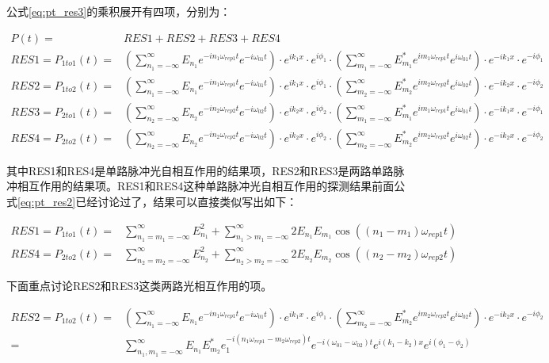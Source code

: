 公式\eqref{eq:pt_res3}的乘积展开有四项，分别为：
\begin{footnotesize}
\begin{align}
    P(t)=&RES1+RES2+RES3+RES4\\
    RES1=P_{1to1}(t)=&\left(\sum_{n_1=-\infty}^{\infty}E_{n_1}e^{-in_1\omega_{rep1}t}e^{-i\omega_{01}t}\right)\cdot e^{ik_1x}\cdot e^{i\phi_1} 
    \cdot \left(\sum_{m_1=-\infty}^{\infty}E_{m_1}^* e^{im_1\omega_{rep1}t}e^{i\omega_{01}t}\right)\cdot e^{-ik_1x}\cdot e^{-i\phi_1}\\
    RES2=P_{1to2}(t)=&\left(\sum_{n_1=-\infty}^{\infty}E_{n_1}e^{-in_1\omega_{rep1}t}e^{-i\omega_{01}t}\right)\cdot e^{ik_1x}\cdot e^{i\phi_1} 
    \cdot \left(\sum_{m_2=-\infty}^{\infty}E_{m_2}^*e^{im_2\omega_{rep2}t}e^{i\omega_{02}t}\right)\cdot e^{-ik_2x}\cdot e^{-i\phi_2}\\
    RES3=P_{2to1}(t)=&\left(\sum_{n_2=-\infty}^{\infty}E_{n_2}e^{-in_2\omega_{rep2}t}e^{-i\omega_{02}t}\right)\cdot e^{ik_2x}\cdot e^{i\phi_2}
    \cdot \left(\sum_{m_1=-\infty}^{\infty}E_{m_1}^* e^{im_1\omega_{rep1}t}e^{i\omega_{01}t}\right)\cdot e^{-ik_1x}\cdot e^{-i\phi_1}\\
    RES4=P_{2to2}(t)=&\left(\sum_{n_2=-\infty}^{\infty}E_{n_2}e^{-in_2\omega_{rep2}t}e^{-i\omega_{02}t}\right)\cdot e^{ik_2x}\cdot e^{i\phi_2}
    \cdot \left(\sum_{m_2=-\infty}^{\infty}E_{m_2}^*e^{im_2\omega_{rep2}t}e^{i\omega_{02}t}\right)\cdot e^{-ik_2x}\cdot e^{-i\phi_2}
\end{align}
\end{footnotesize}

其中RES1和RES4是单路脉冲光自相互作用的结果项，RES2和RES3是两路单路脉冲相互作用的结果项。RES1和RES4这种单路脉冲光自相互作用的探测结果前面公式\eqref{eq:pt_res2}已经讨论过了，结果可以直接类似写出如下：

\begin{align}
    RES1=P_{1to1}(t)=&\sum_{n_1=m_1=-\infty}^{\infty}E_{n_1}^2 + \sum_{n_1>m_1=-\infty}^{\infty}2E_{n_1} E_{m_1} \cos\left((n_1-m_1)\omega_{rep1}t\right)\label{eq:final_res1}\\
    RES4=P_{2to2}(t)=&\sum_{n_2=m_2=-\infty}^{\infty}E_{n_2}^2 + \sum_{n_2>m_2=-\infty}^{\infty}2E_{n_2} E_{m_2} \cos\left((n_2-m_2)\omega_{rep2}t\right)\label{eq:final_res4}
\end{align}


下面重点讨论RES2和RES3这类两路光相互作用的项。
\begin{footnotesize}
\begin{align}
    RES2=P_{1to2}(t)=&\left(\sum_{n_1=-\infty}^{\infty}E_{n_1}e^{-in_1\omega_{rep1}t}e^{-i\omega_{01}t}\right)\cdot e^{ik_1x}\cdot e^{i\phi_1} 
    \cdot \left(\sum_{m_2=-\infty}^{\infty}E_{m_2}^*e^{im_2\omega_{rep2}t}e^{i\omega_{02}t}\right)\cdot e^{-ik_2x}\cdot e^{-i\phi_2}\\
    =&\sum_{n_1,m_1=-\infty}^{\infty}E_{n_1}E_{m_2}^*e_1^{-i(n_1\omega_{rep1}-m_2\omega_{rep2})t}e^{-i(\omega_{01}-\omega_{02})t}e^{i(k_1-k_2)x}e^{i(\phi_1-\phi_2)}
\end{align}
\end{footnotesize}

